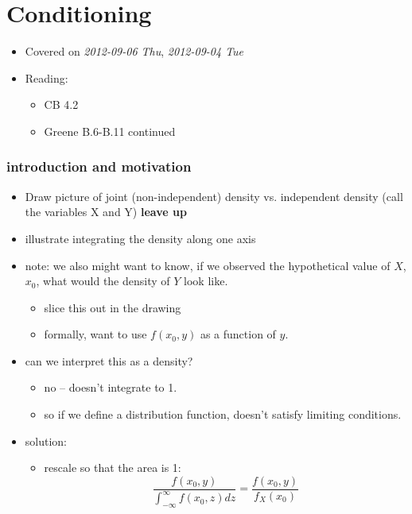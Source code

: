 
\part{Conditioning}

\begin{itemize}
\item Covered on \textit{2012-09-06 Thu}, \textit{2012-09-04 Tue}
\item Reading:
\begin{itemize}
\item CB 4.2
\item Greene B.6-B.11 continued
\end{itemize}
\end{itemize}
\section{introduction and motivation}
\label{sec-1}

\begin{itemize}
\item Draw picture of joint (non-independent) density vs. independent
      density (call the variables X and Y) \textbf{leave up}
\item illustrate integrating the density along one axis
\item note: we also might want to know, if we observed the hypothetical
      value of $X$, $x_0$, what would the density of $Y$ look like.
\begin{itemize}
\item slice this out in the drawing
\item formally, want to use $f(x_0, y)$ as a function of $y$.
\end{itemize}
\item can we interpret this as a density?
\begin{itemize}
\item no -- doesn't integrate to 1.
\item so if we define a distribution function, doesn't satisfy
        limiting conditions.
\end{itemize}
\item solution:
\begin{itemize}
\item rescale so that the area is 1:
        \[ \frac{f(x_0, y)}{\int_{-\infty}^{\infty} f(x_0, z) dz} =
        \frac{f(x_0, y)}{f_X(x_0)}\]
\end{itemize}
\end{itemize}
